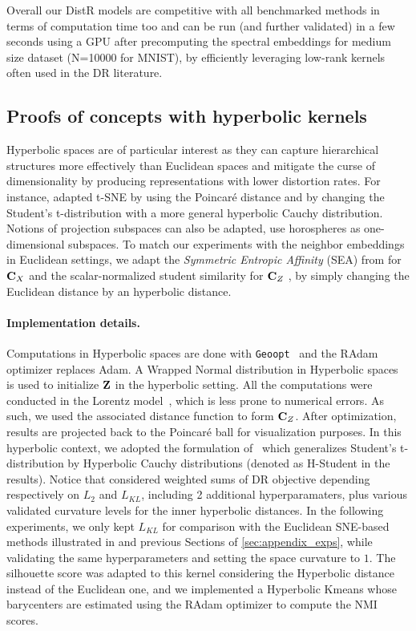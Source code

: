 Overall our DistR models are competitive with all benchmarked methods in terms of computation time too and can be run (and further validated) in a few seconds using a GPU after precomputing the spectral embeddings for medium size dataset (N=10000 for MNIST), by efficiently leveraging low-rank kernels often used in the DR literature.



\subsection{Proofs of concepts with hyperbolic kernels}\label{sec:hyperbolic}

Hyperbolic spaces \cite{Chami21, Fan_2022_CVPR, Guo22, Lin23} are of particular interest as they can capture hierarchical structures more effectively than Euclidean spaces and mitigate the curse of dimensionality by producing representations with lower distortion rates. For instance, \cite{Guo22} adapted t-SNE by using the Poincaré distance and by changing the Student's t-distribution with a more general hyperbolic Cauchy distribution.  Notions of projection subspaces can also be adapted, \eg \cite{Chami21} use horospheres as one-dimensional subspaces. To match our experiments with the neighbor embeddings in Euclidean settings, we adapt the \emph{Symmetric Entropic Affinity} (SEA) from \cite{van2023snekhorn} for ${\mathbf{C}}_X$ and the scalar-normalized student similarity for ${\mathbf{C}}_Z$ \cite{van2008visualizing}, by simply changing the Euclidean distance by an hyperbolic distance.


\paragraph{Implementation details.} Computations in Hyperbolic spaces are done with \texttt{Geoopt}~\cite{geoopt2020kochurov} and the RAdam optimizer \cite{becigneul2018riemannian} replaces Adam. A Wrapped Normal distribution in Hyperbolic spaces~\cite{Nagano19} is used to initialize ${\mathbf{Z}}$ in the hyperbolic setting.
All the computations were conducted in the Lorentz model~\cite{Nickel18}, which is less prone to numerical errors. As such, we used the associated distance function to form ${\mathbf{C}}_Z$. After optimization, results are projected back to the Poincaré ball for visualization purposes. In this hyperbolic context, we adopted the formulation of~\cite{Guo22} which generalizes Student's t-distribution by Hyperbolic Cauchy distributions (denoted as H-Student in the results). Notice that \cite{Guo22} considered weighted sums of DR objective depending respectively on $L_2$ and $L_{KL}$, including 2 additional hyperparamaters, plus various validated curvature levels for the inner hyperbolic distances. In the following experiments, we only kept $L_{KL}$ for comparison with the Euclidean SNE-based methods illustrated in  and previous Sections of \ref{sec:appendix_exps}, while validating the same hyperparameters and setting the space curvature to $1$. The silhouette score was adapted to this kernel considering the Hyperbolic distance instead of the Euclidean one, and we implemented a Hyperbolic Kmeans whose barycenters are estimated using the RAdam optimizer to compute the NMI scores.


